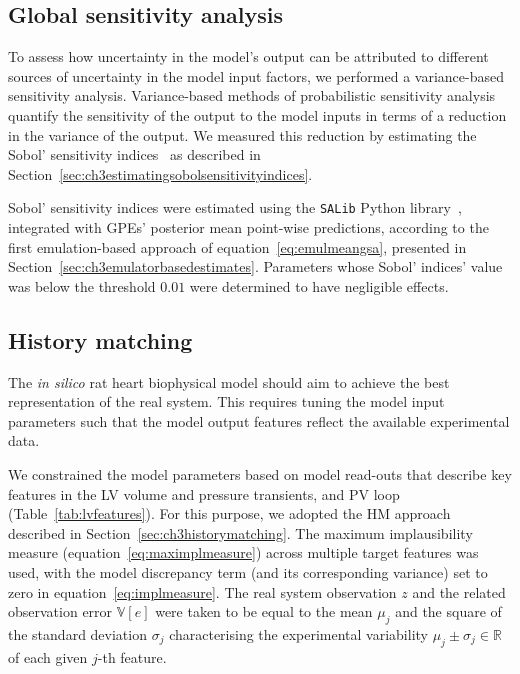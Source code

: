 %
%
%
\subsection{Global sensitivity analysis}\label{sec:ch4global_sensitivity_analysis}
To assess how uncertainty in the model's output can be attributed to different sources of uncertainty in the model input factors, we performed a variance-based sensitivity analysis. Variance-based methods of probabilistic sensitivity analysis quantify the sensitivity of the output to the model inputs in terms of a reduction in the variance of the output. We measured this reduction by estimating the Sobol' sensitivity indices~\cite{Sobol:2001} as described in Section~\ref{sec:ch3estimatingsobolsensitivityindices}.

\vspace{0.2cm}
Sobol' sensitivity indices were estimated using the \texttt{SALib} Python library~\cite{Herman:2017}, integrated with GPEs' posterior mean point-wise predictions, according to the first emulation-based approach of equation~\eqref{eq:emulmeangsa}, presented in Section~\ref{sec:ch3emulatorbasedestimates}. Parameters whose Sobol' indices' value was below the threshold $0.01$ were determined to have negligible effects.


%
%
%
\subsection{History matching}\label{sec:ch4historymatching}
The \textit{in silico} rat heart biophysical model should aim to achieve the best representation of the real system. This requires tuning the model input parameters such that the model output features reflect the available experimental data.

\vspace{0.2cm}
We constrained the model parameters based on model read-outs that describe key features in the LV volume and pressure transients, and PV loop (Table~\ref{tab:lvfeatures}). For this purpose, we adopted the HM approach described in Section~\ref{sec:ch3historymatching}. The maximum implausibility measure (equation~\eqref{eq:maximplmeasure}) across multiple target features was used, with the model discrepancy term (and its corresponding variance) set to zero in equation~\eqref{eq:implmeasure}. The real system observation $z$ and the related observation error $\mathbb{V}[e]$ were taken to be equal to the mean $\mu_j$ and the square of the standard deviation $\sigma_j$ characterising the experimental variability $\mu_j\pm\sigma_j\in\mathbb{R}$ of each given $j$-th feature.

